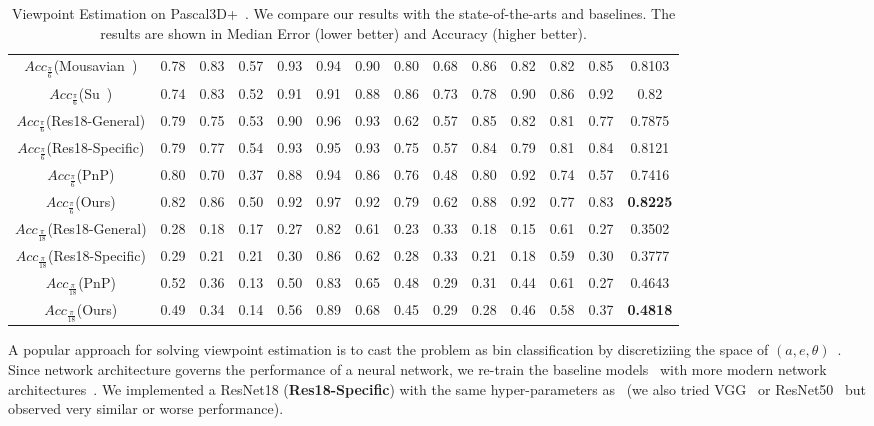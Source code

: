 \documentclass[runningheads]{llncs}
\begin{document}
\begin{table*}[t]
{\begin{tabular}{c|cccccccccccc|c}
$\mathit{Acc}_\frac{\pi}{6}$(Mousavian~\cite{mousavian20173d})& 0.78& {0.83} & 0.57& { 0.93} &0.94& { 0.90}& { 0.80}& { 0.68} & 0.86& { 0.82}& { 0.82}& { 0.85} & { 0.8103} \\
$\mathit{Acc}_\frac{\pi}{6}$(Su~\cite{su2015render})& 0.74 & 0.83 & 0.52 & 0.91 & 0.91 & 0.88 & 0.86 & 0.73 & 0.78 & 0.90 & 0.86 & 0.92 & 0.82  \\
$\mathit{Acc}_\frac{\pi}{6}$(Res18-General)& 0.79 & 0.75 & 0.53 & 0.90 & 0.96 & 0.93 & 0.62 & 0.57 & 0.85 & 0.82 & 0.81 & 0.77 & 0.7875 \\
$\mathit{Acc}_\frac{\pi}{6}$(Res18-Specific)& 0.79& 0.77 & 0.54 & 0.93 & 0.95 & 0.93 & 0.75 & 0.57 & 0.84 & 0.79 & 0.81 & 0.84 & 0.8121 \\
$\mathit{Acc}_\frac{\pi}{6}$(PnP)& 0.80 & 0.70 & 0.37 & 0.88 & 0.94 & 0.86 & 0.76 & 0.48 & 0.80 & 0.92 & 0.74 & 0.57 & 0.7416  \\
$\mathit{Acc}_\frac{\pi}{6}$(Ours)& 0.82& 0.86 & 0.50 & 0.92 & 0.97 & 0.92 & 0.79 & 0.62 & 0.88 & 0.92 & 0.77 & 0.83 & {\bf 0.8225}  \\
\hline
$\mathit{Acc}_\frac{\pi}{18}$(Res18-General)& 0.28 & 0.18 & 0.17 & 0.27 & 0.82 & 0.61 & 0.23 & 0.33 & 0.18 & 0.15 & 0.61 & 0.27 & 0.3502 \\
$\mathit{Acc}_\frac{\pi}{18}$(Res18-Specific)& 0.29& 0.21 & 0.21 & 0.30 & 0.86 & 0.62 & 0.28 & 0.33 & 0.21 & 0.18 & 0.59 & 0.30 & 0.3777 \\
$\mathit{Acc}_\frac{\pi}{18}$(PnP)& 0.52 & 0.36 & 0.13 & 0.50 & 0.83 & 0.65 & 0.48 & 0.29 & 0.31 & 0.44 & 0.61 & 0.27 & 0.4643\\
$\mathit{Acc}_\frac{\pi}{18}$(Ours)& 0.49& 0.34 & 0.14 & 0.56 & 0.89 & 0.68 & 0.45 & 0.29 & 0.28 & 0.46 & 0.58 & 0.37 & {\bf 0.4818}\\
\hline
\end{tabular}
}
\caption{Viewpoint Estimation on Pascal3D+~\cite{xiang2014beyond}. We compare our results with the state-of-the-arts and baselines. The results are shown in Median Error (lower better) and Accuracy (higher better).}
\label{tab:pascal_viewpoint}
\end{table*}

A popular approach for solving viewpoint estimation is to cast the problem as bin classification by discretiziing the space of $(a, e, \theta)$~\cite{tulsiani2015viewpoints,mousavian20173d,su2015render,mahendran2017joint}. Since network architecture governs the performance of a neural network, we re-train the baseline models~\cite{tulsiani2015viewpoints} with more modern network architectures~\cite{he2016deep}.
We implemented a ResNet18 (\textbf{Res18-Specific}) with the same hyper-parameters as~\cite{tulsiani2015viewpoints} (we also tried VGG~\cite{simonyan2014very} or ResNet50~\cite{he2016deep} but observed very similar or worse performance).
\end{document}
